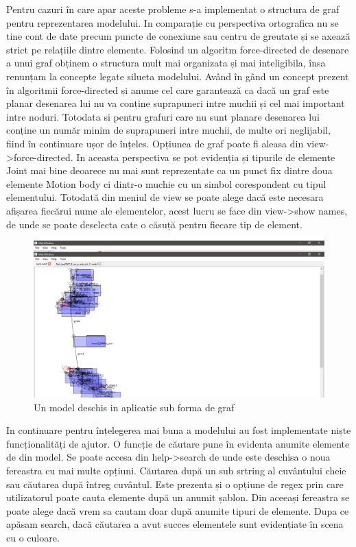 Pentru cazuri în care apar aceste probleme s-a implementat o structura de graf pentru reprezentarea modelului. 
In comparație cu perspectiva ortografica nu se tine cont de date precum puncte de conexiune sau centru de greutate și se axează strict pe relațiile dintre elemente. 
Folosind un algoritm force-directed de desenare a unui graf obținem o structura mult mai organizata și mai inteligibila, 
însa renunțam la concepte legate silueta modelului. Având în gând un concept prezent în algoritmii force-directed și anume 
cel care garantează ca dacă un graf este planar desenarea lui nu va conține suprapuneri intre muchii și cel mai important 
intre noduri. Totodata si pentru grafuri care nu sunt planare desenarea lui conține un număr minim de suprapuneri intre muchii, 
de multe ori neglijabil, fiind în continuare ușor de înțeles. Opțiunea de graf poate fi aleasa din view->force-directed. 
In aceasta perspectiva se pot evidenția și tipurile de elemente Joint mai bine deoarece nu mai sunt reprezentate ca un punct 
fix dintre doua elemente Motion body ci dintr-o muchie cu un simbol corespondent cu tipul elementului. Totodată din meniul 
de view se poate alege dacă este necesara afișarea fiecărui nume ale elementelor, acest lucru se face din view->show names, 
de unde se poate deselecta cate o căsuță pentru fiecare tip de element.\newline 

\begin{figure}[H]
    \includegraphics[width=\linewidth]{imagini/implementare/graf.png}
    \caption{Un model deschis in aplicatie sub forma de graf}
    \label{fig:tabs}
\end{figure}

In continuare pentru înțelegerea mai buna a modelului 
au fost implementate niște funcționalități de ajutor. O funcție de căutare pune în evidenta anumite elemente de din model. 
Se poate accesa din help->search de unde este deschisa o noua fereastra cu mai multe opțiuni. Căutarea după un sub srtring 
al cuvântului cheie sau căutarea după întreg cuvântul. Este prezenta și o opțiune de regex prin care utilizatorul poate 
cauta elemente după un anumit șablon. Din aceeași fereastra se poate alege dacă vrem sa cautam doar după anumite tipuri 
de elemente. Dupa ce apăsam search, dacă căutarea a avut succes elementele sunt evidențiate în scena cu o culoare.\newline 

